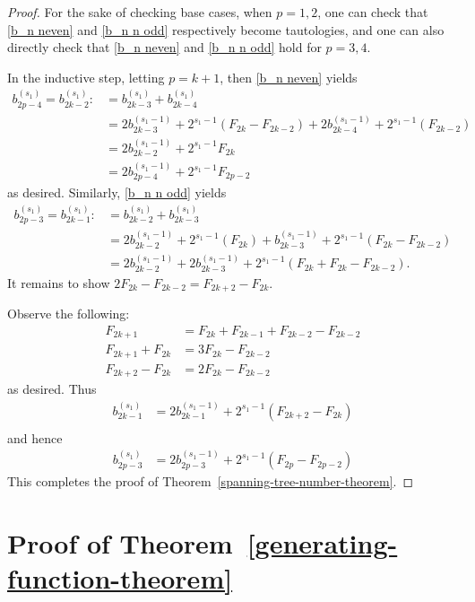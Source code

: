\documentclass[10pt,reqno]{amsart}
\begin{document}
\begin{proof}
For the sake of checking base cases, when $p=1,2$, one can check that  \eqref{b_n neven} and \eqref{b_n n odd}  respectively become tautologies, and 
one can also directly check that \eqref{b_n neven} and \eqref{b_n n odd} hold for $p= 3,4.$

In the inductive step, letting $p=k+1$, then  \eqref{b_n neven}  yields
\begin{align*}
b_{2p-4}^{(s_1)} = b_{2k-2}^{(s_1)}:&=  b_{2k-3}^{(s_1)} + b_{2k-4}^{(s_1)} \\ 
& =  2b_{2k-3}^{(s_1-1)} + 2^{s_1-1}(F_{2k}-F_{2k-2})+2b_{2k-4}^{(s_1-1)} + 2^{s_1-1}(F_{2k-2})\\
& =  2b_{2k-2}^{(s_1-1)} + 2^{s_1-1}F_{2k}\\ 
& =  2b_{2p-4}^{(s_1-1)} + 2^{s_1-1}F_{2p-2} 
\end{align*}
as desired. Similarly,  \eqref{b_n n odd} yields
\begin{align*}
b_{2p-3}^{(s_1)} = b_{2k-1}^{(s_1)}:&=  b_{2k-2}^{(s_1)} + b_{2k-3}^{(s_1)} \\ 
& =  2b_{2k-2}^{(s_1-1)} + 2^{s_1-1}(F_{2k})+b_{2k-3}^{(s_1-1)} + 2^{s_1-1}(F_{2k}-F_{2k-2})\\
& = 2b_{2k-2}^{(s_1-1)} + 2b_{2k-3}^{(s_1-1)}+2^{s_1-1}(F_{2k}+F_{2k}-F_{2k-2}).
\end{align*}
\vspace{1cm}
It remains to show 
    \hspace{1.4cm}$2F_{2k}-F_{2k-2} = F_{2k+2} -F_{2k}.$
    
\noindent
Observe the following:
\begin{align*}
F_{2k+1} &= F_{2k} + F_{2k-1} +F_{2k-2} - F_{2k-2}\\
F_{2k+1} +F_{2k} &= 3F_{2k} - F_{2k-2}\\
F_{2k+2} -F_{2k} &= 2F_{2k} - F_{2k-2}
\end{align*} as desired. Thus 
\begin{align*}
b_{2k-1}^{(s_1)}&= 2b_{2k-1}^{(s_1-1)}+2^{s_1-1}(F_{2k+2} -F_{2k})\\ 
\end{align*} 
and hence
\begin{align*} 
b_{2p-3}^{(s_1)}&=  2b_{2p-3}^{(s_1-1)} + 2^{s_1-1}(F_{2p}-F_{2p-2})
\end{align*} 
This completes the proof of Theorem~\ref{spanning-tree-number-theorem}.
\end{proof}



\section{Proof of Theorem~\ref{generating-function-theorem}}
\label{gen function}
\end{document}
